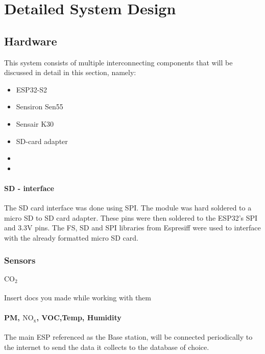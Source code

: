 \chapter{Detailed System Design}
\vspace{-2em}
\section{Hardware}


This system consists of multiple interconnecting components that will be discussed in detail in this section, namely:
\begin{itemize}
	\item ESP32-S2
	\item Sensiron Sen55
	\item Sensair K30
	\item SD-card adapter
	\item 
	\item
	
\end{itemize} 



\subsubsection{SD - interface}
The SD card interface was done using SPI. The module was hard soldered to a micro SD to SD card adapter. These pins were then soldered to the ESP32's SPI and 3.3V pins.
The FS, SD and SPI libraries from Espresiff were used to interface with the already formatted micro SD card.




\subsection{Sensors}
\subsubsection{$\mathrm{CO_2}$}
{\color{red} \huge Insert docs you made while working with them}



\subsubsection{PM, $\mathrm{NO_x}$, VOC,Temp, Humidity}
\noindent
The main ESP referenced as the Base station, will be connected periodically to the internet to send the data it collects to the database of choice. 

